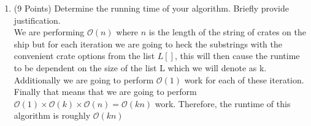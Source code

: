 \documentclass{article}
\renewcommand{\O}{\mathcal{O}}
\newcounter{ProblemCounter}
\newenvironment{problem}[1][Problem]{
 \begin{trivlist}
 \item[\hskip \labelsep {\bfseries #1}\hskip \labelsep {%
 \bfseries \theProblemCounter.%
 \stepcounter{ProblemCounter}%
 }]
}{
 \end{trivlist}
}
\begin{document}
\begin{problem}
\begin{enumerate}[label=\textbf{\alph*.)}]
    \item (9 Points) Determine the running time of your algorithm. Briefly provide justification.\\
    We are performing $\O(n)$ where $n$ is the length of the string of crates on the ship but for each iteration we are going to heck the substrings with the convenient crate options from the list $L[]$, this will then cause the runtime to be dependent on the size of the list L which we will denote as k. Additionally we are going to perform $\O(1)$ work for each of these iteration. Finally that means that we are going to perform $\O(1)\times \O(k) \times \O(n) = \O(kn)$ work. Therefore, the runtime of this algorithm is roughly $\O(kn)$
\end{enumerate}
\end{problem}
\end{document}
